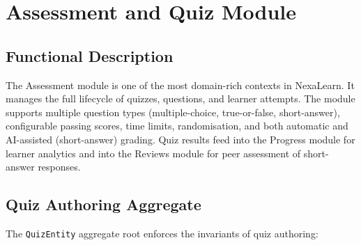 
\section{Assessment and Quiz Module}
\label{sec:assessment-module}

\subsection{Functional Description}

The Assessment module is one of the most domain-rich contexts in NexaLearn. It manages the full lifecycle of quizzes, questions, and learner attempts. The module supports multiple question types (multiple-choice, true-or-false, short-answer), configurable passing scores, time limits, randomisation, and both automatic and AI-assisted (short-answer) grading. Quiz results feed into the Progress module for learner analytics and into the Reviews module for peer assessment of short-answer responses.

\subsection{Quiz Authoring Aggregate}

The \texttt{QuizEntity} aggregate root enforces the invariants of quiz authoring:


